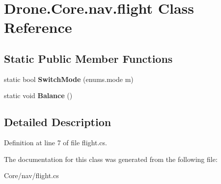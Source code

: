 \hypertarget{class_drone_1_1_core_1_1nav_1_1flight}{}\section{Drone.\+Core.\+nav.\+flight Class Reference}
\label{class_drone_1_1_core_1_1nav_1_1flight}
\subsection*{Static Public Member Functions}
\begin{DoxyCompactItemize}
\item 
\hypertarget{class_drone_1_1_core_1_1nav_1_1flight_aae26573893caf9db32926af3047a3099}{}static bool {\bfseries Switch\+Mode} (enums.\+mode m)\label{class_drone_1_1_core_1_1nav_1_1flight_aae26573893caf9db32926af3047a3099}

\item 
\hypertarget{class_drone_1_1_core_1_1nav_1_1flight_aed5c1ab2b733a6a6a6928d32d472c7b1}{}static void {\bfseries Balance} ()\label{class_drone_1_1_core_1_1nav_1_1flight_aed5c1ab2b733a6a6a6928d32d472c7b1}

\end{DoxyCompactItemize}


\subsection{Detailed Description}


Definition at line 7 of file flight.\+cs.



The documentation for this class was generated from the following file\+:\begin{DoxyCompactItemize}
\item 
Core/nav/flight.\+cs\end{DoxyCompactItemize}
